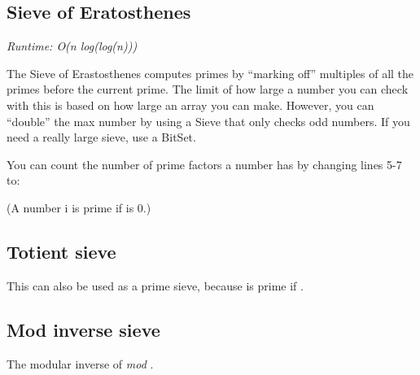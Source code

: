 
\subsection*{Sieve of Eratosthenes}

\textit{Runtime: O(n log(log(n)))}

The Sieve of Erastosthenes computes primes by “marking off” multiples of all the primes before the current prime. The limit of how large a number you can check with this is based on how large an array you can make. However, you can “double” the max number by using a Sieve that only checks odd numbers. If you need a really large sieve, use a BitSet.



You can count the number of prime factors a number has by changing lines 5-7 to:



(A number i is prime if  is 0.)

\subsection*{Totient sieve}

This can also be used as a prime sieve, because  is prime if .



\subsection*{Mod inverse sieve}

The modular inverse of  \textit{mod} .



\newpage